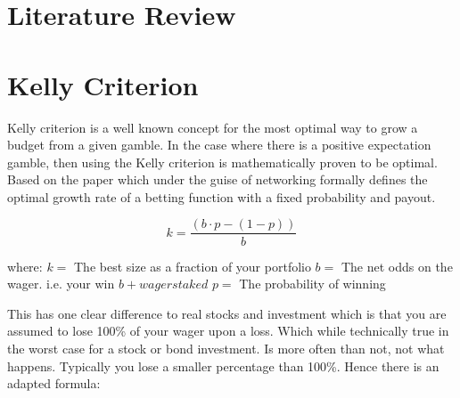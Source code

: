 \documentclass[12pt]{article}
\begin{document}
\section{Literature Review}

\section{Kelly Criterion}

Kelly criterion is a well known concept for the most optimal way to grow a budget from a given
gamble. In the case where there is a positive expectation gamble, then using the Kelly criterion
is mathematically proven to be optimal. Based on the paper which under the guise of networking
formally defines the optimal growth rate of a betting function with a fixed probability and
payout.\newline

\[ k = \frac{(b \cdot p - (1 - p))}{b} \]

where:\newline
\(k =\) The best size as a fraction of your portfolio\newline
\(b =\) The net odds on the wager. i.e. your win \(b + wager staked\) \newline
\(p =\) The probability of winning

This has one clear difference to real stocks and investment which is that you are assumed to lose 100\% of your wager upon a loss. 
Which while technically true in the worst case for a stock or bond investment. Is more often than not, not what happens. 
Typically you lose a smaller percentage than 100\%. Hence there is an adapted formula: \cite{Alon}



\end{document}
